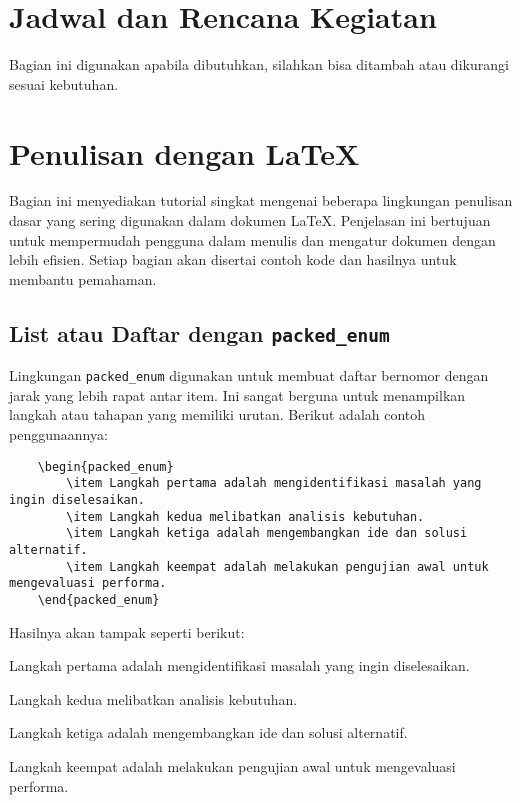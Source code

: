 \section{Jadwal dan Rencana Kegiatan}
Bagian ini digunakan apabila dibutuhkan, silahkan bisa ditambah atau dikurangi sesuai kebutuhan.

\section{Penulisan dengan \LaTeX}
Bagian ini menyediakan tutorial singkat mengenai beberapa lingkungan penulisan dasar yang sering digunakan dalam dokumen LaTeX. Penjelasan ini bertujuan untuk mempermudah pengguna dalam menulis dan mengatur dokumen dengan lebih efisien. Setiap bagian akan disertai contoh kode dan hasilnya untuk membantu pemahaman.

\subsection{List atau Daftar dengan \texttt{packed\_enum}}
Lingkungan \texttt{packed\_enum} digunakan untuk membuat daftar bernomor dengan jarak yang lebih rapat antar item. Ini sangat berguna untuk menampilkan langkah atau tahapan yang memiliki urutan. Berikut adalah contoh penggunaannya:

\begin{lstlisting}
    \begin{packed_enum}
        \item Langkah pertama adalah mengidentifikasi masalah yang ingin diselesaikan.
        \item Langkah kedua melibatkan analisis kebutuhan.
        \item Langkah ketiga adalah mengembangkan ide dan solusi alternatif.
        \item Langkah keempat adalah melakukan pengujian awal untuk mengevaluasi performa.
    \end{packed_enum}
\end{lstlisting}
    
Hasilnya akan tampak seperti berikut:
\begin{packed_enum}
    \item Langkah pertama adalah mengidentifikasi masalah yang ingin diselesaikan.
    \item Langkah kedua melibatkan analisis kebutuhan.
    \item Langkah ketiga adalah mengembangkan ide dan solusi alternatif.
    \item Langkah keempat adalah melakukan pengujian awal untuk mengevaluasi performa.
\end{packed_enum}

